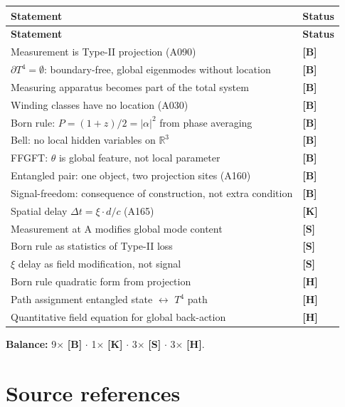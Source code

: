 \begin{center}
\small
\begin{longtable}{@{}p{}l@{}}
\toprule
\textbf{Statement} & \textbf{Status} \\
\midrule
\endfirsthead
\toprule
\textbf{Statement} & \textbf{Status} \\
\midrule
\endhead
Measurement is Type-II projection (A090) & \textbf{[B]} \\
$\partial T^4 = \emptyset$: boundary-free, global eigenmodes without location & \textbf{[B]} \\
Measuring apparatus becomes part of the total system & \textbf{[B]} \\
Winding classes have no location (A030) & \textbf{[B]} \\
Born rule: $P = (1+z)/2 = |\alpha|^2$ from phase averaging & \textbf{[B]} \\
Bell: no local hidden variables on $\mathbb{R}^3$ & \textbf{[B]} \\
FFGFT: $\theta$ is global feature, not local parameter & \textbf{[B]} \\
Entangled pair: one object, two projection sites (A160) & \textbf{[B]} \\
Signal-freedom: consequence of construction, not extra condition & \textbf{[B]} \\
Spatial delay $\Delta t = \xi \cdot d/c$ (A165) & \textbf{[K]} \\
Measurement at A modifies global mode content & \textbf{[S]} \\
Born rule as statistics of Type-II loss & \textbf{[S]} \\
$\xi$ delay as field modification, not signal & \textbf{[S]} \\
Born rule quadratic form from projection & \textbf{[H]} \\
Path assignment entangled state $\leftrightarrow$ $T^4$ path & \textbf{[H]} \\
Quantitative field equation for global back-action & \textbf{[H]} \\
\bottomrule
\end{longtable}
\end{center}

\textbf{Balance:} 9$\times$ \textbf{[B]} $\cdot$
1$\times$ \textbf{[K]} $\cdot$
3$\times$ \textbf{[S]} $\cdot$
3$\times$ \textbf{[H]}.

\section{Source references}


